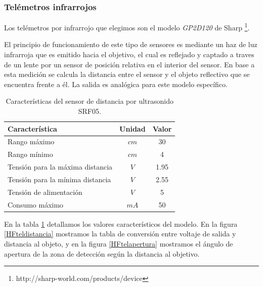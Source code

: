 \subsubsection{Tel\'emetros infrarrojos}
\label{HStelemetros}

Los tel\'emetros por infrarrojo que elegimos son el modelo \emph{GP2D120} de Sharp \footnote{http://sharp-world.com/products/device}.

El principio de funcionamiento de este tipo de sensores es mediante un haz de luz infrarroja que es emitido hacia el objetivo, el cual
es reflejado y captado a traves de un lente por un sensor de posici\'on relativa en el interior del sensor. En base a esta medici\'on
se calcula la distancia entre el sensor y el objeto reflectivo que se encuentra frente a \'el. La salida es anal\'ogica para este
modelo espec\'ifico.

\begin{table}[ht]
	\begin{center}
		\begin{tabular}{|l|c|c|}
			\hline
			Caracter\'istica & Unidad & Valor\\
			\hline
			Rango m\'aximo & $cm$ & 30 \\
			Rango m\'inimo & $cm$ & 4 \\
			Tensi\'on para la m\'axima distancia & $V$ & 1.95 \\
			Tensi\'on para la m\'inima distancia & $V$ & 2.55 \\
			Tensi\'on de alimentaci\'on & $V$ & 5 \\
			Consumo m\'aximo & $mA$ & 50 \\
			\hline
		\end{tabular}
	\end{center}
	\caption{Caracter\'isticas del sensor de distancia por ultrasonido SRF05.}
	\label{HTtel}
\end{table}

En la tabla \ref{HTtel} detallamos los valores caracter\'isticos del modelo. En la figura \ref{HFteldistancia} mostramos la tabla de
conversi\'on entre voltaje de salida y distancia al objeto, y en la figura \ref{HFtelapertura} mostramos el \'angulo de apertura de
la zona de detecci\'on seg\'un la distancia al objetivo.

